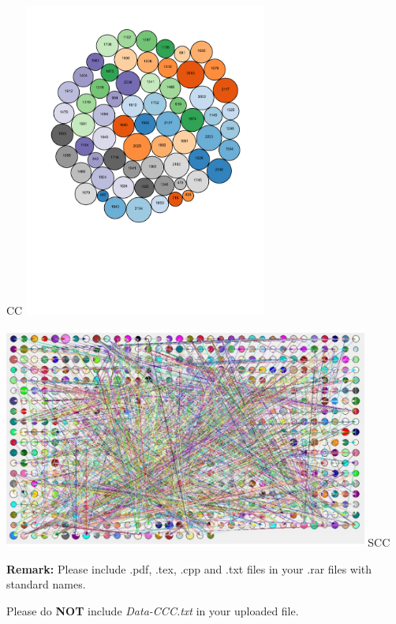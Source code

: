 \documentclass[12pt,a4paper]{article}
\theoremstyle{definition}
\begin{document}
\begin{enumerate}
\begin{enumerate}
    \begin{center}
    	CC
    	\includegraphics[width=0.6\textwidth]{CC.pdf}
    \end{center}
	\begin{center}
		\includegraphics[width=0.9\textwidth]{SCC.pdf}
		SCC
	\end{center}

    \end{enumerate}
\end{enumerate}

\textbf{Remark:} Please include {\color{red}.pdf}, {\color{red}.tex}, {\color{red}.cpp} and {\color{red}.txt} files in your .rar files with standard names.

\qquad \quad \quad Please do \textbf{NOT} include \emph{Data-CCC.txt} in your uploaded file.

\end{document}
